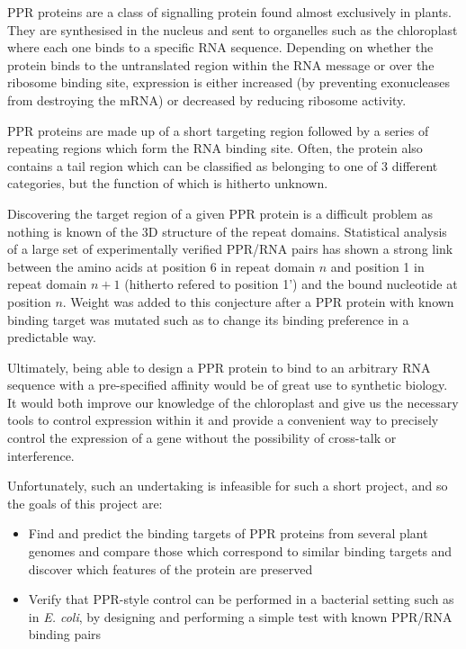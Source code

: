 \documentclass[twoside,a4paper]{article}
\begin{document}
\begin{multicols}{2}
PPR proteins are a class of signalling protein found almost exclusively in
plants\cite{Small2000}. 
They are synthesised in the nucleus and sent to organelles such as the 
chloroplast where each one binds to a specific RNA sequence.
Depending on whether the protein binds to the untranslated region within the
RNA message or over the ribosome binding site, expression is either increased 
(by preventing exonucleases from destroying the mRNA) or decreased by reducing 
ribosome activity\cite{Pfalz2009}.

PPR proteins are made up of a short targeting region followed by a series of
repeating regions which form the RNA binding site.
Often, the protein also contains a tail region which can be classified as
belonging to one of 3 different categories, 
but the function of which is hitherto unknown\cite{Lurin2004}.

Discovering the target region of a given PPR protein is a difficult problem as
nothing is known of the 3D structure of the repeat domains.
Statistical analysis of a large set of experimentally verified PPR/RNA pairs
has shown a strong link between the amino acids at position 6 in repeat domain
$n$ and position 1 in repeat domain $n+1$ (hitherto refered to position 1')
and the bound nucleotide at position $n$\cite{Barkan2012}.
Weight was added to this conjecture after a PPR protein with known binding
target was mutated such as to change its binding preference in a predictable
way\cite{Barkan2012}.

Ultimately, being able to design a PPR protein to bind to an arbitrary RNA
sequence with a pre-specified affinity would be of great use to synthetic
biology.
It would both improve our knowledge of the chloroplast and give us the
necessary tools to control expression within it and provide a convenient way to
precisely control the expression of a gene without the possibility of 
cross-talk or interference.

Unfortunately, such an undertaking is infeasible for such a short project, and
so the goals of this project are:
\begin{itemize}
  \item Find and predict the binding targets of PPR proteins from several plant 
    genomes and compare those which correspond to
    similar binding targets and discover which features of the protein are
    preserved
  \item Verify that PPR-style control can be performed in a bacterial setting
    such as in \textit{E. coli}, by designing and performing a simple test 
    with known PPR/RNA binding pairs
\end{itemize}



\end{multicols}
\end{document}
